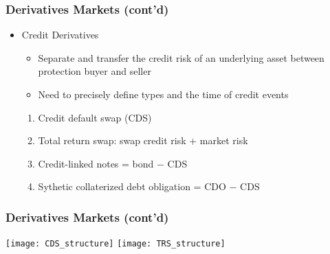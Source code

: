 \documentclass[10pt]{beamer}
\begin{document}
	\begin{frame}
		\frametitle{Derivatives Markets (cont'd)}
		
		\begin{itemize}
			
			\item Credit Derivatives
			\begin{itemize}
				\item Separate and transfer the credit risk of an underlying asset between protection buyer and seller
				\item Need to precisely define types and the time of credit events
			\end{itemize}
			
			\begin{enumerate} \vspace{10pt} \itemsep10pt
				\item Credit default swap (CDS)
				\item Total return swap: swap credit risk + market risk
				\item Credit-linked notes = bond $-$ CDS
				\item Sythetic collaterized debt obligation = CDO $-$ CDS
			\end{enumerate}
			
		\end{itemize}
		
	\end{frame}
	
	
	\begin{frame}
		\frametitle{Derivatives Markets (cont'd)} \vspace{-5.2pt}
		
		\begin{center}
			\texttt{[image: CDS\_structure]} 
			\texttt{[image: TRS\_structure]} 
		\end{center}		
		
	\end{frame}
	
\end{document}
